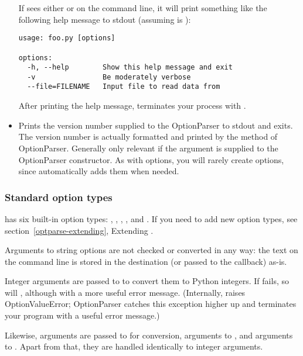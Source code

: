 \begin{itemize}
If  sees either  or  on the command line, it
will print something like the following help message to stdout
(assuming  is ):
\begin{verbatim}
usage: foo.py [options]

options:
  -h, --help        Show this help message and exit
  -v                Be moderately verbose
  --file=FILENAME   Input file to read data from
\end{verbatim}

After printing the help message,  terminates your process
with .

\item {} 

Prints the version number supplied to the OptionParser to stdout and
exits.  The version number is actually formatted and printed by the
 method of OptionParser.  Generally only relevant
if the  argument is supplied to the OptionParser
constructor.  As with  options, you will rarely create
 options, since  automatically adds them when needed.

\end{itemize}


\subsubsection{Standard option types\label{optparse-standard-option-types}}

 has six built-in option types: , , ,
,  and .  If you need to add new option
types, see section~\ref{optparse-extending}, Extending .

Arguments to string options are not checked or converted in any way: the
text on the command line is stored in the destination (or passed to the
callback) as-is.

Integer arguments are passed to  to convert them to Python
integers.  If  fails, so will , although with a more
useful error message.  (Internally,  raises OptionValueError;
OptionParser catches this exception higher up and terminates your
program with a useful error message.)

Likewise,  arguments are passed to  for conversion,
 arguments to , and  arguments to
.  Apart from that, they are handled identically to integer
arguments.

